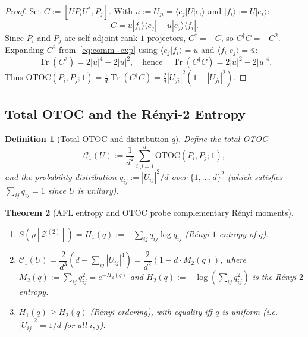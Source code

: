\documentclass[12pt,a4paper]{article}
\newtheorem{theorem}{Theorem}[section]
\newtheorem{definition}[theorem]{Definition}
\DeclareMathOperator{\Tr}{Tr}
\begin{document}
\begin{proof}
Set $C:=[UP_iU^*,P_j]$.  With $u:=U_{ji}=\langle e_j|U|e_i\rangle$ and
$|f_i\rangle:=U|e_i\rangle$:
\begin{equation}\label{eq:comm_exp}
  C = \bar{u}|f_i\rangle\langle e_j| - u|e_j\rangle\langle f_i|.
\end{equation}
Since $P_i$ and $P_j$ are self-adjoint rank-$1$ projectors, $C^\dagger=-C$, so
$C^\dagger C = -C^2$.  Expanding $C^2$ from~\eqref{eq:comm_exp} using
$\langle e_j|f_i\rangle=u$ and $\langle f_i|e_j\rangle=\bar{u}$:
\[
  \Tr(C^2) = 2|u|^4 - 2|u|^2,
  \quad\text{hence}\quad
  \Tr(C^\dagger C) = 2|u|^2 - 2|u|^4.
\]
Thus $\mathrm{OTOC}(P_i,P_j;1) = \frac{1}{d}\Tr(C^\dagger C) = \frac{2}{d}|U_{ji}|^2(1-|U_{ji}|^2)$.
\end{proof}

\subsection{Total OTOC and the Rényi-2 Entropy}

\begin{definition}[Total OTOC and distribution $q$]
Define the \emph{total OTOC}
\[
  \mathcal{C}_1(U) := \frac{1}{d^2}\sum_{i,j=1}^d \mathrm{OTOC}(P_i,P_j;1),
\]
and the probability distribution $q_{ij}:=|U_{ij}|^2/d$ over $\{1,\ldots,d\}^2$
(which satisfies $\sum_{ij}q_{ij}=1$ since $U$ is unitary).
\end{definition}

\begin{theorem}[AFL entropy and OTOC probe complementary Rényi moments]
\label{thm:afl_otoc}
\begin{enumerate}
  \item $S(\rho[\mathcal{Z}^{(2)}]) = H_1(q) := -\sum_{ij}q_{ij}\log q_{ij}$
        \quad (Rényi-$1$ entropy of $q$).
  \item $\mathcal{C}_1(U) = \dfrac{2}{d^3}\!\left(d - \sum_{ij}|U_{ij}|^4\right)
        = \dfrac{2}{d^2}\!\left(1 - d\cdot M_2(q)\right)$,
        where $M_2(q):=\sum_{ij}q_{ij}^2 = e^{-H_2(q)}$ and
        $H_2(q):=-\log\!\left(\sum_{ij}q_{ij}^2\right)$ is the Rényi-$2$ entropy.
  \item $H_1(q)\geq H_2(q)$ (Rényi ordering), with equality iff $q$ is uniform
        (i.e.\ $|U_{ij}|^2=1/d$ for all $i,j$).
\end{enumerate}
\end{theorem}
\end{document}

